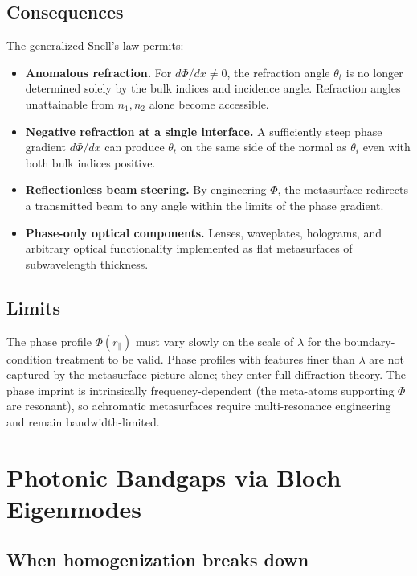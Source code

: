 \documentclass[11pt,a4paper]{article}
\begin{document}
\subsection{Consequences}

The generalized Snell's law permits:

\begin{itemize}[noitemsep]
\item \textbf{Anomalous refraction.} For $d\Phi/dx \neq 0$, the refraction angle $\theta_t$ is no longer determined solely by the bulk indices and incidence angle. Refraction angles unattainable from $n_1, n_2$ alone become accessible.
\item \textbf{Negative refraction at a single interface.} A sufficiently steep phase gradient $d\Phi/dx$ can produce $\theta_t$ on the same side of the normal as $\theta_i$ even with both bulk indices positive.
\item \textbf{Reflectionless beam steering.} By engineering $\Phi$, the metasurface redirects a transmitted beam to any angle within the limits of the phase gradient.
\item \textbf{Phase-only optical components.} Lenses, waveplates, holograms, and arbitrary optical functionality implemented as flat metasurfaces of subwavelength thickness.
\end{itemize}

\subsection{Limits}

The phase profile $\Phi(r_\parallel)$ must vary slowly on the scale of $\lambda$ for the boundary-condition treatment to be valid. Phase profiles with features finer than $\lambda$ are not captured by the metasurface picture alone; they enter full diffraction theory. The phase imprint is intrinsically frequency-dependent (the meta-atoms supporting $\Phi$ are resonant), so achromatic metasurfaces require multi-resonance engineering and remain bandwidth-limited.

\section{Photonic Bandgaps via Bloch Eigenmodes}

\subsection{When homogenization breaks down}
\end{document}
